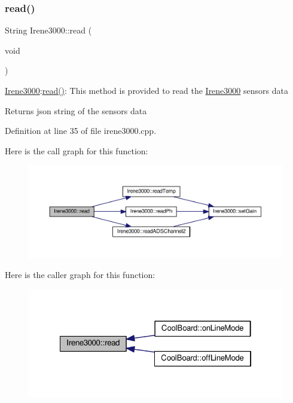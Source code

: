 \subsubsection{\texorpdfstring{read()}{read()}}
{\footnotesize\ttfamily String Irene3000\+::read (\begin{DoxyParamCaption}\item[{void}]{ }\end{DoxyParamCaption})}

\hyperlink{class_irene3000}{Irene3000}\+:\hyperlink{class_irene3000_a852a170feea994ea1df01c6b245b5d9a}{read()}\+: This method is provided to read the \hyperlink{class_irene3000}{Irene3000} sensors data

\begin{DoxyReturn}{Returns}
json string of the sensors data 
\end{DoxyReturn}


Definition at line 35 of file irene3000.\+cpp.

Here is the call graph for this function\+:
\nopagebreak
\begin{figure}[H]
\begin{center}
\leavevmode
\includegraphics[width=350pt]{d6/d03/class_irene3000_a852a170feea994ea1df01c6b245b5d9a_cgraph}
\end{center}
\end{figure}
Here is the caller graph for this function\+:
\nopagebreak
\begin{figure}[H]
\begin{center}
\leavevmode
\includegraphics[width=322pt]{d6/d03/class_irene3000_a852a170feea994ea1df01c6b245b5d9a_icgraph}
\end{center}
\end{figure}
\mbox{\label{class_irene3000_ae73bd2ed14a199a7e83f4d6458476a7c}} 
